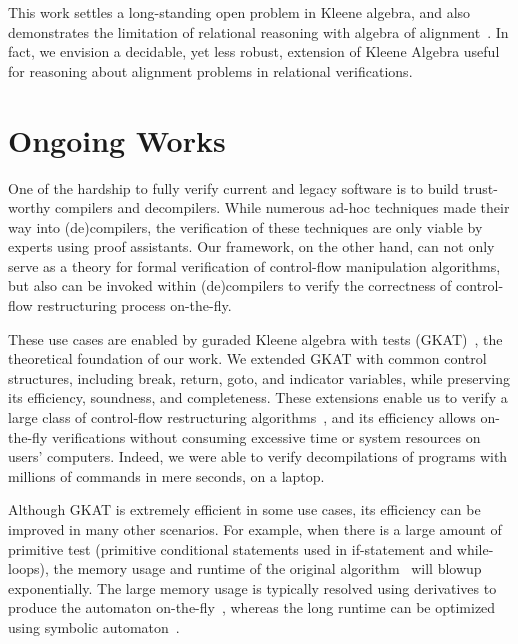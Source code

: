 \documentclass[11pt,a4paper,sans]{moderncv} %
\begin{document}
This work settles a long-standing open problem in Kleene algebra, and also demonstrates the limitation of relational reasoning with algebra of alignment~\cite{antonopoulos_AlgebraAlignmentRelational_2023}. In fact, we envision a decidable, yet less robust, extension of Kleene Algebra useful for reasoning about alignment problems in relational verifications.

\section{Ongoing Works}


One of the hardship to fully verify current and legacy software is to build trust-worthy compilers and decompilers. 
While numerous ad-hoc techniques made their way into (de)compilers, the verification of these techniques are only viable by experts using proof assistants. 
Our framework, on the other hand, can not only serve as a theory for formal verification of control-flow manipulation algorithms, but also can be invoked within (de)compilers to verify the correctness of control-flow restructuring process on-the-fly.

These use cases are enabled by guraded Kleene algebra with tests (GKAT)~\cite{smolka_GuardedKleeneAlgebra_2020}, the theoretical foundation of our work.
We extended GKAT with common control structures, including break, return, goto, and indicator variables, while preserving its efficiency, soundness, and completeness.
These extensions enable us to verify a large class of control-flow restructuring algorithms~\cite{yakdan_NoMoreGotos_2015,basque_AhoySAILRThere_,erosa_TamingControlFlow_1994,kozen_CertificationCompilerOptimizations_2000a}, and its efficiency allows on-the-fly verifications without consuming excessive time or system resources on users' computers.
Indeed, we were able to verify decompilations of programs with millions of commands in mere seconds, on a laptop. 


Although GKAT is extremely efficient in some use cases, its efficiency can be improved in many other scenarios. 
For example, when there is a large amount of primitive test (primitive conditional statements used in if-statement and while-loops), the memory usage and runtime of the original algorithm~\cite{smolka_GuardedKleeneAlgebra_2020} will blowup exponentially. 
The large memory usage is typically resolved using derivatives to produce the automaton on-the-fly~\cite{brzozowski_DerivativesRegularExpressions_1964, schmid_GuardedKleeneAlgebra_2021}, whereas the long runtime can be optimized using symbolic automaton~\cite{pous_SymbolicAlgorithmsLanguage_2015}. 
\end{document}

